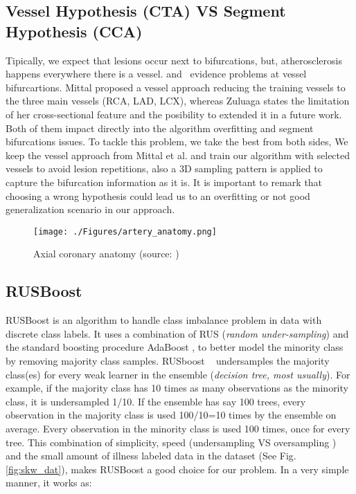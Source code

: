 \subsection{Vessel Hypothesis (CTA) VS Segment Hypothesis (CCA)}\label{dect:hypo}

Tipically, we expect that lesions occur next to bifurcations, but, atherosclerosis happens everywhere there is a vessel. \citep{Mittal2010} and~\citep{Zuluaga2011a} evidence problems at vessel bifurcartions. Mittal proposed a vessel approach reducing the training vessels to the three main vessels (RCA, LAD, LCX), whereas Zuluaga states the limitation of her cross-sectional feature and the posibility to extended it in a future work. Both of them impact directly into the algorithm overfitting and segment bifurcations issues. To tackle this problem, we take the best from both sides, We keep the vessel approach from Mittal et al. and train our algorithm with selected vessels to avoid lesion repetitions, also a 3D sampling pattern is applied to capture the bifurcation information as it is. It is important to remark that choosing a wrong hypothesis could lead us to an overfitting or not good generalization scenario in our approach.

\begin{figure}[h]
	\centering
		\texttt{[image: ./Figures/artery\_anatomy.png]}
	\caption[Axial Coronary Anatomy]{Axial coronary anatomy (source: \citep{Kirisli2013})}
	\label{fig:art_ana}
\end{figure}

\subsection{RUSBoost}\label{dect:rus}

RUSBoost is an algorithm to handle class imbalance problem in data with discrete class labels. It uses a combination of RUS (\textit{random under-sampling}) and the standard boosting procedure AdaBoost \citep{Freund1996}, to better model the minority class by removing majority class samples. RUSboost ~\citep{Seiffert2010} undersamples the majority class(es) for every weak learner in the ensemble  (\textit{decision tree, most usually}). For example, if the majority class has 10 times as many observations as the minority class, it is undersampled 1/10. If the ensemble has say 100 trees, every observation in the majority class is used 100/10=10 times by the ensemble on average. Every observation in the minority class is used 100 times, once for every tree. This combination of simplicity, speed (undersampling VS oversampling ) and the small amount of illness labeled data in the dataset (See Fig. \ref{fig:skw_dat}), makes RUSBoost a good choice for our problem. In a very simple manner, it works as:

